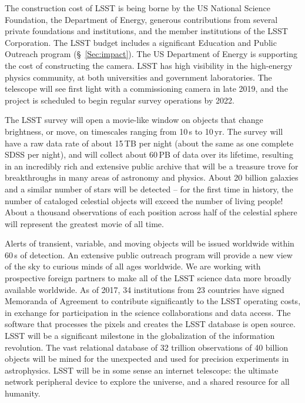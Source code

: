 The construction cost of LSST is being borne by the US National Science
Foundation, the Department of Energy, generous contributions from several
private foundations and institutions, and the member institutions of the
LSST Corporation. The LSST budget includes a significant Education and
Public Outreach program (\S~\ref{Sec:impact}).
The US Department of Energy is supporting the cost of constructing the
camera. LSST has high visibility in the high-energy physics community,
at both universities and government laboratories. The telescope will
see first light with a commissioning camera in late 2019, and the
project is scheduled to begin regular survey operations by 2022.

The LSST survey will open a movie-like window on objects that
change brightness, or move, on timescales ranging from 10\,s to 10\,yr.
The survey will have a raw data rate of about 15\,TB per night (about the same as one
complete SDSS per night), and will collect about 60\,PB
of data over its lifetime, resulting in an incredibly rich and extensive
public archive that will be a treasure trove for breakthroughs in many areas
of astronomy and physics. About 20 billion galaxies and a similar number of stars
will be detected -- for the first time in history, the number of cataloged
celestial objects will exceed the number of living people! About a thousand
observations of each position across half of the celestial sphere will
represent the greatest movie of all time.

Alerts of transient, variable, and moving objects will be issued worldwide within
60\,s of detection.
An extensive public outreach program will provide a new view of the sky to
curious minds of all ages worldwide.
We are working with prospective foreign partners to make all of the LSST science data
more broadly available worldwide.  As of 2017, 34 institutions from 23 countries
have signed Memoranda of Agreement to contribute significantly to
the LSST operating costs, in exchange for participation in the science collaborations
and data access.  The software that processes the pixels
and creates the LSST database is open source.
LSST will be a significant milestone in the globalization of the information revolution.
The vast relational database of 32 trillion observations of 40 billion objects
will be mined for the unexpected and used for precision experiments in astrophysics.
LSST will be in some sense an internet telescope:
the ultimate network peripheral device to explore the universe, and
a shared resource for all humanity.

